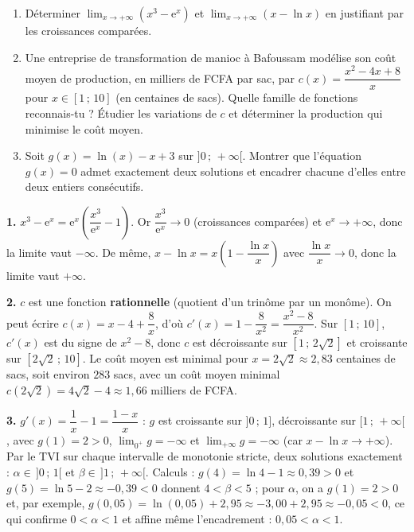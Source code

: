 \documentclass[11pt]{article}
\begin{document}
\begin{exercice}
\begin{enumerate}
\item Déterminer $\displaystyle\lim_{x \to +\infty} \left( x^3 - \mathrm{e}^x \right)$ et $\displaystyle\lim_{x \to +\infty} \left( x - \ln x \right)$ en justifiant par les croissances comparées.
\item Une entreprise de transformation de manioc à Bafoussam modélise son coût moyen de production, en milliers de FCFA par sac, par $c(x) = \dfrac{x^2 - 4x + 8}{x}$ pour $x \in [1\,;\,10]$ (en centaines de sacs). Quelle famille de fonctions reconnais-tu ? Étudier les variations de $c$ et déterminer la production qui minimise le coût moyen.
\item Soit $g(x) = \ln(x) - x + 3$ sur $]0\,;\,+\infty[$. Montrer que l'équation $g(x) = 0$ admet exactement deux solutions et encadrer chacune d'elles entre deux entiers consécutifs.
\end{enumerate}
\end{exercice}

\begin{corrige}
\textbf{1.} $x^3 - \mathrm{e}^x = \mathrm{e}^x\left( \dfrac{x^3}{\mathrm{e}^x} - 1 \right)$. Or $\dfrac{x^3}{\mathrm{e}^x} \to 0$ (croissances comparées) et $\mathrm{e}^x \to +\infty$, donc la limite vaut $-\infty$. De même, $x - \ln x = x\left( 1 - \dfrac{\ln x}{x} \right)$ avec $\dfrac{\ln x}{x} \to 0$, donc la limite vaut $+\infty$.
\par\smallskip
\textbf{2.} $c$ est une fonction \textbf{rationnelle} (quotient d'un trinôme par un monôme). On peut écrire $c(x) = x - 4 + \dfrac{8}{x}$, d'où $c'(x) = 1 - \dfrac{8}{x^2} = \dfrac{x^2 - 8}{x^2}$. Sur $[1\,;\,10]$, $c'(x)$ est du signe de $x^2 - 8$, donc $c$ est décroissante sur $[1\,;\,2\sqrt{2}]$ et croissante sur $[2\sqrt{2}\,;\,10]$. Le coût moyen est minimal pour $x = 2\sqrt{2} \approx 2{,}83$ centaines de sacs, soit environ $283$ sacs, avec un coût moyen minimal $c(2\sqrt{2}) = 4\sqrt{2} - 4 \approx 1{,}66$ milliers de FCFA.
\par\smallskip
\textbf{3.} $g'(x) = \dfrac{1}{x} - 1 = \dfrac{1-x}{x}$ : $g$ est croissante sur $]0\,;\,1]$, décroissante sur $[1\,;\,+\infty[$, avec $g(1) = 2 > 0$, $\lim_{0^+} g = -\infty$ et $\lim_{+\infty} g = -\infty$ (car $x - \ln x \to +\infty$). Par le TVI sur chaque intervalle de monotonie stricte, deux solutions exactement : $\alpha \in\, ]0\,;\,1[$ et $\beta \in\, ]1\,;\,+\infty[$. Calculs : $g(4) = \ln 4 - 1 \approx 0{,}39 > 0$ et $g(5) = \ln 5 - 2 \approx -0{,}39 < 0$ donnent $4 < \beta < 5$ ; pour $\alpha$, on a $g(1) = 2 > 0$ et, par exemple, $g(0{,}05) = \ln(0{,}05) + 2{,}95 \approx -3{,}00 + 2{,}95 \approx -0{,}05 < 0$, ce qui confirme $0 < \alpha < 1$ et affine même l'encadrement : $0{,}05 < \alpha < 1$.
\end{corrige}
\end{document}
